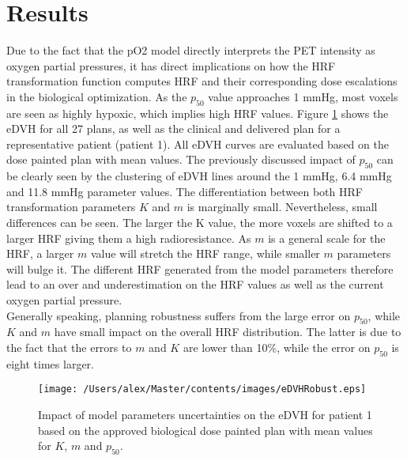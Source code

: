 \section{Results}
Due to the fact that the pO2 model directly interprets the PET intensity as oxygen partial pressures, it has direct implications on how the HRF transformation function computes HRF and their corresponding dose escalations in the biological optimization. As the $p_{50}$ value approaches 1 mmHg, most voxels are seen as highly hypoxic, which implies high HRF values. Figure \ref{fig:eDVHRobust} shows the eDVH for all 27 plans, as well as the clinical and delivered plan for a representative patient  (patient 1). All eDVH curves are evaluated based on the dose painted plan with mean values. The previously discussed impact of $p_{50}$ can be clearly seen by the clustering of eDVH lines around the 1 mmHg, 6.4 mmHg and 11.8 mmHg parameter values. The differentiation between both HRF transformation parameters $K$ and $m$ is marginally small. Nevertheless, small differences can be seen. The larger the K value, the more voxels are shifted to a larger HRF giving them a high radioresistance. As $m$ is a general scale for the HRF, a larger $m$ value will stretch the HRF range, while smaller $m$ parameters will bulge it. The different HRF generated from the model parameters therefore lead to an over and underestimation on the HRF values as well as the current oxygen partial pressure.\\Generally speaking, planning robustness suffers from the large error on $p_{50}$, while $K$ and $m$ have small impact on the overall HRF distribution. The latter is due to the fact that the errors to $m$ and $K$ are lower than 10\%, while the error on $p_{50}$ is eight times larger.
\begin{figure}[htb]
\centering
\texttt{[image: /Users/alex/Master/contents/images/eDVHRobust.eps]}
\vspace{1cm}
\caption{Impact of model parameters uncertainties on the eDVH for patient 1 based on the approved biological dose painted plan with mean values for $K$, $m$ and $p_{50}$.}
\label{fig:eDVHRobust}
\end{figure}
